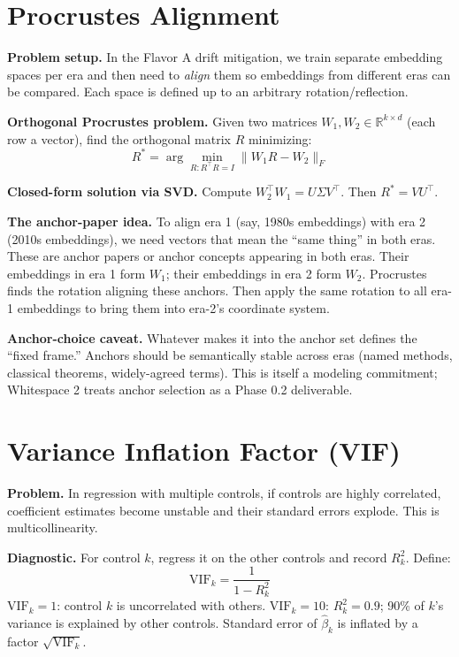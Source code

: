\documentclass[11pt]{article}
\begin{document}
\section{Procrustes Alignment}
\label{sec:procrustes}

\textbf{Problem setup.} In the Flavor A drift mitigation, we train
separate embedding spaces per era and then need to \textit{align} them
so embeddings from different eras can be compared. Each space is defined
up to an arbitrary rotation/reflection.

\textbf{Orthogonal Procrustes problem.} Given two matrices
$W_1, W_2 \in \mathbb{R}^{k \times d}$ (each row a vector), find the
orthogonal matrix $R$ minimizing:
\[
  R^* = \arg\min_{R : R^\top R = I} \| W_1 R - W_2 \|_F
\]

\textbf{Closed-form solution via SVD.} Compute
$W_2^\top W_1 = U \Sigma V^\top$. Then $R^* = V U^\top$.

\textbf{The anchor-paper idea.} To align era 1 (say, 1980s embeddings)
with era 2 (2010s embeddings), we need vectors that mean the ``same
thing'' in both eras. These are anchor papers or anchor concepts
appearing in both eras. Their embeddings in era 1 form $W_1$; their
embeddings in era 2 form $W_2$. Procrustes finds the rotation aligning
these anchors. Then apply the same rotation to all era-1 embeddings to
bring them into era-2's coordinate system.

\textbf{Anchor-choice caveat.} Whatever makes it into the anchor set
defines the ``fixed frame.'' Anchors should be semantically stable
across eras (named methods, classical theorems, widely-agreed terms).
This is itself a modeling commitment; Whitespace 2 treats anchor
selection as a Phase 0.2 deliverable.

\section{Variance Inflation Factor (VIF)}
\label{sec:vif}

\textbf{Problem.} In regression with multiple controls, if controls
are highly correlated, coefficient estimates become unstable and their
standard errors explode. This is multicollinearity.

\textbf{Diagnostic.} For control $k$, regress it on the other controls
and record $R_k^2$. Define:
\[
  \text{VIF}_k = \frac{1}{1 - R_k^2}
\]
$\text{VIF}_k = 1$: control $k$ is uncorrelated with others.
$\text{VIF}_k = 10$: $R_k^2 = 0.9$; 90\% of $k$'s variance is
explained by other controls. Standard error of $\hat\beta_k$ is
inflated by a factor $\sqrt{\text{VIF}_k}$.
\end{document}
